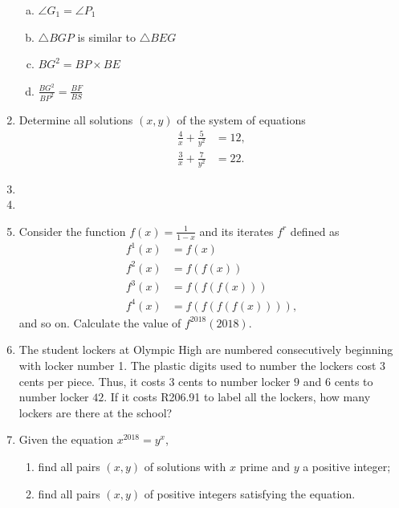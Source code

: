 \documentclass{article}
\begin{document}
\begin{enumerate}[1.]
\begin{enumerate}[a.]
  \item $\angle G_1 = \angle P_1$
  \item $\triangle BGP$ is similar to $\triangle BEG$
  \item $BG^2 = BP \times BE$
  \item $\frac{BG^2}{BP^2} = \frac{BF}{BS}$
\end{enumerate}



\vspace{6pt}
\item Determine all solutions $(x,y)$ of the system of equations
\begin{align*}
  \frac{4}{x} +\frac{5}{y^2} &= 12, \\
  \frac{3}{x} +\frac{7}{y^2} &= 22.
\end{align*}


\vspace{6pt}
\item 


\vspace{6pt}
\item 


\vspace{6pt}
\item 
Consider the function $f(x) = \frac{1}{1-x}$ and its iterates $f^r$ defined as
\begin{align*}
  f^1(x) &= f(x) \\
  f^2(x) &= f(f(x)) \\
  f^3(x) &= f(f(f(x))) \\
  f^4(x) &= f(f(f(f(x)))),
\end{align*}
and so on. Calculate the value of $f^{2018}(2018)$.


\vspace{6pt}
\item %
The student lockers at Olympic High are numbered consecutively beginning with locker number 1. The plastic digits used to number the lockers cost $3$ cents per piece. Thus, it costs $3$ cents to number locker $9$ and $6$ cents to number locker $42$. If it costs R206.91 to label all the lockers, how many lockers are there at the school?


\vspace{6pt}
\item %
Given the equation $x^{2018} = y^x$,
\begin{enumerate}
  \item find all pairs $(x,y)$ of solutions with $x$ prime and $y$ a positive integer;
  \item find all pairs $(x,y)$ of positive integers satisfying the equation.
\end{enumerate}

\end{enumerate}


\vfill
\begin{center}
\begin{BVerbatim}

\end{BVerbatim}
\end{center}
\end{document}
